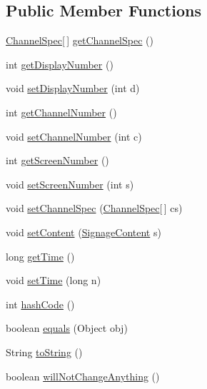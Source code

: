 \subsection*{Public Member Functions}
\begin{DoxyCompactItemize}
\item 
\hyperlink{classgov_1_1fnal_1_1ppd_1_1dd_1_1xml_1_1ChannelSpec}{Channel\-Spec}\mbox{[}$\,$\mbox{]} \hyperlink{classgov_1_1fnal_1_1ppd_1_1dd_1_1xml_1_1ChangeChannelList_a3ac96208085eddfd542c3c8a5ff5d253}{get\-Channel\-Spec} ()
\item 
int \hyperlink{classgov_1_1fnal_1_1ppd_1_1dd_1_1xml_1_1ChangeChannelList_a706b925ebdc2d33ae56aceefa5b98b8c}{get\-Display\-Number} ()
\item 
void \hyperlink{classgov_1_1fnal_1_1ppd_1_1dd_1_1xml_1_1ChangeChannelList_ae6e267ac94db6c4cb6c6827956f155a6}{set\-Display\-Number} (int d)
\item 
int \hyperlink{classgov_1_1fnal_1_1ppd_1_1dd_1_1xml_1_1ChangeChannelList_a30f0b6e0ffb2a704eca55aa8d8a837cc}{get\-Channel\-Number} ()
\item 
void \hyperlink{classgov_1_1fnal_1_1ppd_1_1dd_1_1xml_1_1ChangeChannelList_a5659a693177f14e4b3607187b7a2af42}{set\-Channel\-Number} (int c)
\item 
int \hyperlink{classgov_1_1fnal_1_1ppd_1_1dd_1_1xml_1_1ChangeChannelList_ac3902231ef662040bb3db9bb346ea211}{get\-Screen\-Number} ()
\item 
void \hyperlink{classgov_1_1fnal_1_1ppd_1_1dd_1_1xml_1_1ChangeChannelList_a8606640138f8ec87404c5715441def83}{set\-Screen\-Number} (int s)
\item 
void \hyperlink{classgov_1_1fnal_1_1ppd_1_1dd_1_1xml_1_1ChangeChannelList_ae7a1f9d40ba94b2595d73e87d4d83f9b}{set\-Channel\-Spec} (\hyperlink{classgov_1_1fnal_1_1ppd_1_1dd_1_1xml_1_1ChannelSpec}{Channel\-Spec}\mbox{[}$\,$\mbox{]} cs)
\item 
void \hyperlink{classgov_1_1fnal_1_1ppd_1_1dd_1_1xml_1_1ChangeChannelList_af5679b942430bb2771086c9cfdc7bc2f}{set\-Content} (\hyperlink{interfacegov_1_1fnal_1_1ppd_1_1dd_1_1signage_1_1SignageContent}{Signage\-Content} s)
\item 
long \hyperlink{classgov_1_1fnal_1_1ppd_1_1dd_1_1xml_1_1ChangeChannelList_a0818957255b1c719b623e76668221fc2}{get\-Time} ()
\item 
void \hyperlink{classgov_1_1fnal_1_1ppd_1_1dd_1_1xml_1_1ChangeChannelList_a2b12a41a1053a08f77f34aade05dac63}{set\-Time} (long n)
\item 
int \hyperlink{classgov_1_1fnal_1_1ppd_1_1dd_1_1xml_1_1ChangeChannelList_ab968337976c284b5163e84c41432d9bb}{hash\-Code} ()
\item 
boolean \hyperlink{classgov_1_1fnal_1_1ppd_1_1dd_1_1xml_1_1ChangeChannelList_a606a1b3e58eb082b04304df2d124dd67}{equals} (Object obj)
\item 
String \hyperlink{classgov_1_1fnal_1_1ppd_1_1dd_1_1xml_1_1ChangeChannelList_a360603f3f7157fee576cdb6df43cd46b}{to\-String} ()
\item 
boolean \hyperlink{classgov_1_1fnal_1_1ppd_1_1dd_1_1xml_1_1ChangeChannelList_ac26f8d11d57d9a26f688fe39c8d18c55}{will\-Not\-Change\-Anything} ()
\end{DoxyCompactItemize}
